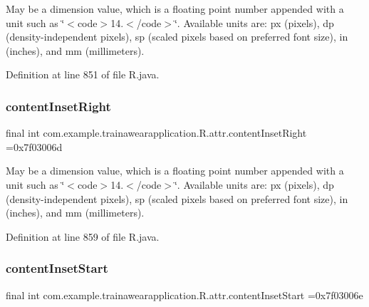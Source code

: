 May be a dimension value, which is a floating point number appended with a unit such as \char`\"{}$<$code$>$14.\+5sp$<$/code$>$\char`\"{}. Available units are\+: px (pixels), dp (density-\/independent pixels), sp (scaled pixels based on preferred font size), in (inches), and mm (millimeters). 

Definition at line 851 of file R.\+java.

\mbox{\label{classcom_1_1example_1_1trainawearapplication_1_1_r_1_1attr_ae213c991ec0103e3b966e3363f737584}} 
\subsubsection{\texorpdfstring{contentInsetRight}{contentInsetRight}}
{\footnotesize\ttfamily final int com.\+example.\+trainawearapplication.\+R.\+attr.\+content\+Inset\+Right =0x7f03006d\hspace{0.3cm}{\ttfamily [static]}}

May be a dimension value, which is a floating point number appended with a unit such as \char`\"{}$<$code$>$14.\+5sp$<$/code$>$\char`\"{}. Available units are\+: px (pixels), dp (density-\/independent pixels), sp (scaled pixels based on preferred font size), in (inches), and mm (millimeters). 

Definition at line 859 of file R.\+java.

\mbox{\label{classcom_1_1example_1_1trainawearapplication_1_1_r_1_1attr_a02127f541fe64c33dd59c3a4b7300c9a}} 
\subsubsection{\texorpdfstring{contentInsetStart}{contentInsetStart}}
{\footnotesize\ttfamily final int com.\+example.\+trainawearapplication.\+R.\+attr.\+content\+Inset\+Start =0x7f03006e\hspace{0.3cm}{\ttfamily [static]}}

